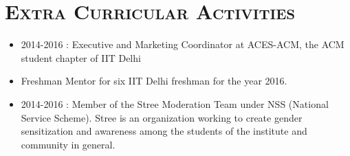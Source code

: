 \documentclass{article}
\newcommand{\tmpsection}[1]{}
\let\tmpsection=\section
\renewcommand{\section}[1]{\tmpsection*{\textsc{#1}}}
\begin{document}
\section{Extra Curricular Activities}

\begin{itemize}
    \setlength\itemsep{0em}
    \item 2014-2016 : Executive and Marketing Coordinator at ACES-ACM, the ACM student chapter of IIT Delhi
    \item Freshman Mentor for six IIT Delhi freshman for the year 2016.
    \item 2014-2016 : Member of the Stree Moderation Team under NSS (National Service Scheme). Stree is an
organization working to create gender sensitization and awareness among the students of the
institute and community in general.
\end{itemize}
\end{document}

